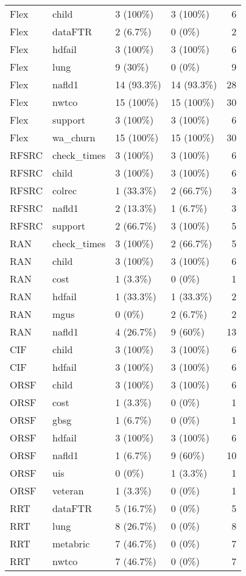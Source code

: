 \begin{longtable}[t]{llllr}
Flex & child & 3 (100\%) & 3 (100\%) & 6\\
Flex & dataFTR & 2 (6.7\%) & 0 (0\%) & 2\\
Flex & hdfail & 3 (100\%) & 3 (100\%) & 6\\
Flex & lung & 9 (30\%) & 0 (0\%) & 9\\
Flex & nafld1 & 14 (93.3\%) & 14 (93.3\%) & 28\\
Flex & nwtco & 15 (100\%) & 15 (100\%) & 30\\
Flex & support & 3 (100\%) & 3 (100\%) & 6\\
Flex & wa\_churn & 15 (100\%) & 15 (100\%) & 30\\
RFSRC & check\_times & 3 (100\%) & 3 (100\%) & 6\\
RFSRC & child & 3 (100\%) & 3 (100\%) & 6\\
RFSRC & colrec & 1 (33.3\%) & 2 (66.7\%) & 3\\
RFSRC & nafld1 & 2 (13.3\%) & 1 (6.7\%) & 3\\
RFSRC & support & 2 (66.7\%) & 3 (100\%) & 5\\
RAN & check\_times & 3 (100\%) & 2 (66.7\%) & 5\\
RAN & child & 3 (100\%) & 3 (100\%) & 6\\
RAN & cost & 1 (3.3\%) & 0 (0\%) & 1\\
RAN & hdfail & 1 (33.3\%) & 1 (33.3\%) & 2\\
RAN & mgus & 0 (0\%) & 2 (6.7\%) & 2\\
RAN & nafld1 & 4 (26.7\%) & 9 (60\%) & 13\\
CIF & child & 3 (100\%) & 3 (100\%) & 6\\
CIF & hdfail & 3 (100\%) & 3 (100\%) & 6\\
ORSF & child & 3 (100\%) & 3 (100\%) & 6\\
ORSF & cost & 1 (3.3\%) & 0 (0\%) & 1\\
ORSF & gbsg & 1 (6.7\%) & 0 (0\%) & 1\\
ORSF & hdfail & 3 (100\%) & 3 (100\%) & 6\\
ORSF & nafld1 & 1 (6.7\%) & 9 (60\%) & 10\\
ORSF & uis & 0 (0\%) & 1 (3.3\%) & 1\\
ORSF & veteran & 1 (3.3\%) & 0 (0\%) & 1\\
RRT & dataFTR & 5 (16.7\%) & 0 (0\%) & 5\\
RRT & lung & 8 (26.7\%) & 0 (0\%) & 8\\
RRT & metabric & 7 (46.7\%) & 0 (0\%) & 7\\
RRT & nwtco & 7 (46.7\%) & 0 (0\%) & 7\\

\end{longtable}
